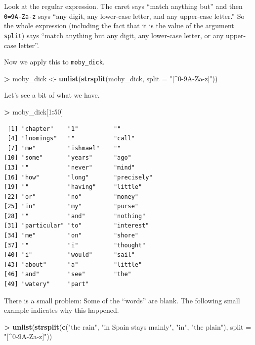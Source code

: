 \documentclass[]{krantz}
\makeatletter
\newenvironment{Shaded}{\begin{snugshade}}{\end{snugshade}}
\newcommand{\KeywordTok}[1]{\textcolor[rgb]{0.27,0.27,0.27}{\textbf{#1}}}
\newcommand{\DataTypeTok}[1]{\textcolor[rgb]{0.27,0.27,0.27}{#1}}
\newcommand{\DecValTok}[1]{\textcolor[rgb]{0.06,0.06,0.06}{#1}}
\newcommand{\StringTok}[1]{\textcolor[rgb]{0.5,0.5,0.5}{#1}}
\newcommand{\OperatorTok}[1]{\textcolor[rgb]{0.43,0.43,0.43}{\textbf{#1}}}
\newcommand{\NormalTok}[1]{#1}
\newenvironment{kframe}{%
\medskip{}
\setlength{\fboxsep}{.8em}
 \def\at@end@of@kframe{}%
 \ifinner\ifhmode%
  \def\at@end@of@kframe{\end{minipage}}%
  \begin{minipage}{\columnwidth}%
 \fi\fi%
 \def\FrameCommand##1{\hskip\@totalleftmargin \hskip-\fboxsep
 \colorbox{shadecolor}{##1}\hskip-\fboxsep
     \hskip-\linewidth \hskip-\@totalleftmargin \hskip\columnwidth}%
 \MakeFramed {\advance\hsize-\width
   \@totalleftmargin\z@ \linewidth\hsize
   \@setminipage}}%
 {\par\unskip\endMakeFramed%
 \at@end@of@kframe}
\renewenvironment{Shaded}{\begin{kframe}}{\end{kframe}}
\makeatother
\begin{document}
Look at the regular expression. The caret says ``match anything but''
and then \texttt{0=9A-Za-z} says ``any digit, any lower-case letter, and
any upper-case letter.'' So the whole expression (including the fact
that it is the value of the argument \texttt{split}) says ``match
anything but any digit, any lower-case letter, or any upper-case
letter''.

Now we apply this to \texttt{moby\_dick}.

\begin{Shaded}
\begin{Highlighting}[]
\OperatorTok{>}\StringTok{ }\NormalTok{moby_dick <-}\StringTok{ }\KeywordTok{unlist}\NormalTok{(}\KeywordTok{strsplit}\NormalTok{(moby_dick, }\DataTypeTok{split =} \StringTok{"[^0-9A-Za-z]"}\NormalTok{))}
\end{Highlighting}
\end{Shaded}

Let's see a bit of what we have.

\begin{Shaded}
\begin{Highlighting}[]
\OperatorTok{>}\StringTok{ }\NormalTok{moby_dick[}\DecValTok{1}\OperatorTok{:}\DecValTok{50}\NormalTok{]}
\end{Highlighting}
\end{Shaded}

\begin{verbatim}
 [1] "chapter"    "1"          ""          
 [4] "loomings"   ""           "call"      
 [7] "me"         "ishmael"    ""          
[10] "some"       "years"      "ago"       
[13] ""           "never"      "mind"      
[16] "how"        "long"       "precisely" 
[19] ""           "having"     "little"    
[22] "or"         "no"         "money"     
[25] "in"         "my"         "purse"     
[28] ""           "and"        "nothing"   
[31] "particular" "to"         "interest"  
[34] "me"         "on"         "shore"     
[37] ""           "i"          "thought"   
[40] "i"          "would"      "sail"      
[43] "about"      "a"          "little"    
[46] "and"        "see"        "the"       
[49] "watery"     "part"      
\end{verbatim}

There is a small problem: Some of the ``words'' are blank. The following
small example indicates why this happened.

\begin{Shaded}
\begin{Highlighting}[]
\OperatorTok{>}\StringTok{ }\KeywordTok{unlist}\NormalTok{(}\KeywordTok{strsplit}\NormalTok{(}\KeywordTok{c}\NormalTok{(}\StringTok{"the rain"}\NormalTok{, }\StringTok{"in Spain    stays mainly"}\NormalTok{, }\StringTok{"in"}\NormalTok{, }\StringTok{"the plain"}\NormalTok{), }\DataTypeTok{split =} \StringTok{"[^0-9A-Za-z]"}\NormalTok{))}
\end{Highlighting}
\end{Shaded}
\end{document}
